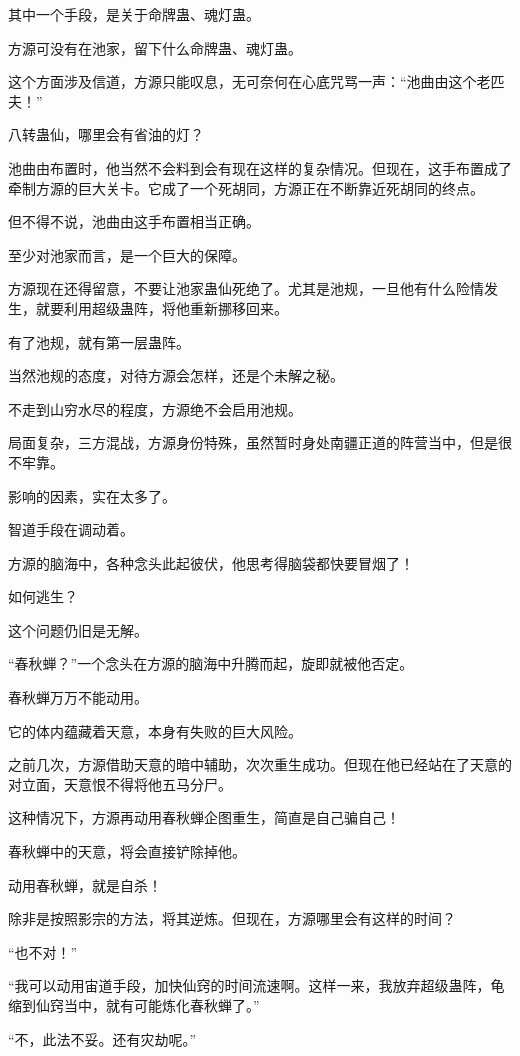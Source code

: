 \begin{this_body}
其中一个手段，是关于命牌蛊、魂灯蛊。

方源可没有在池家，留下什么命牌蛊、魂灯蛊。

这个方面涉及信道，方源只能叹息，无可奈何在心底咒骂一声：“池曲由这个老匹夫！”

八转蛊仙，哪里会有省油的灯？

池曲由布置时，他当然不会料到会有现在这样的复杂情况。但现在，这手布置成了牵制方源的巨大关卡。它成了一个死胡同，方源正在不断靠近死胡同的终点。

但不得不说，池曲由这手布置相当正确。

至少对池家而言，是一个巨大的保障。

方源现在还得留意，不要让池家蛊仙死绝了。尤其是池规，一旦他有什么险情发生，就要利用超级蛊阵，将他重新挪移回来。

有了池规，就有第一层蛊阵。

当然池规的态度，对待方源会怎样，还是个未解之秘。

不走到山穷水尽的程度，方源绝不会启用池规。

局面复杂，三方混战，方源身份特殊，虽然暂时身处南疆正道的阵营当中，但是很不牢靠。

影响的因素，实在太多了。

智道手段在调动着。

方源的脑海中，各种念头此起彼伏，他思考得脑袋都快要冒烟了！

如何逃生？

这个问题仍旧是无解。

“春秋蝉？”一个念头在方源的脑海中升腾而起，旋即就被他否定。

春秋蝉万万不能动用。

它的体内蕴藏着天意，本身有失败的巨大风险。

之前几次，方源借助天意的暗中辅助，次次重生成功。但现在他已经站在了天意的对立面，天意恨不得将他五马分尸。

这种情况下，方源再动用春秋蝉企图重生，简直是自己骗自己！

春秋蝉中的天意，将会直接铲除掉他。

动用春秋蝉，就是自杀！

除非是按照影宗的方法，将其逆炼。但现在，方源哪里会有这样的时间？

“也不对！”

“我可以动用宙道手段，加快仙窍的时间流速啊。这样一来，我放弃超级蛊阵，龟缩到仙窍当中，就有可能炼化春秋蝉了。”

“不，此法不妥。还有灾劫呢。”


\end{this_body}
